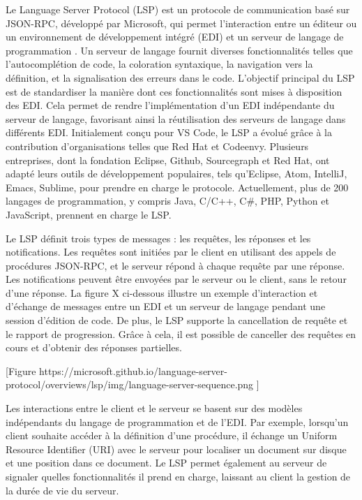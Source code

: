 Le Language Server Protocol (LSP) est un protocole de communication basé sur JSON-RPC, développé par Microsoft, qui permet l'interaction entre un éditeur ou un environnement de développement intégré (EDI) et un serveur de langage de programmation \cite{Keidel2016}. Un serveur de langage fournit diverses fonctionnalités telles que l'autocomplétion de code, la coloration syntaxique, la navigation vers la définition, et la signalisation des erreurs dans le code. L'objectif principal du LSP est de standardiser la manière dont ces fonctionnalités sont mises à disposition des EDI. Cela permet de rendre l'implémentation d'un EDI indépendante du serveur de langage, favorisant ainsi la réutilisation des serveurs de langage dans différents EDI. Initialement conçu pour VS Code, le LSP a évolué grâce à la contribution d'organisations telles que Red Hat et Codeenvy. Plusieurs entreprises, dont la fondation Eclipse, Github, Sourcegraph et Red Hat, ont adapté leurs outils de développement populaires, tels qu'Eclipse, Atom, IntelliJ, Emacs, Sublime, pour prendre en charge le protocole. Actuellement, plus de 200 langages de programmation, y compris Java, C/C++, C\#, PHP, Python et JavaScript, prennent en charge le LSP.

Le LSP définit trois types de messages : les requêtes, les réponses et les notifications. Les requêtes sont initiées par le client en utilisant des appels de procédures JSON-RPC, et le serveur répond à chaque requête par une réponse. Les notifications peuvent être envoyées par le serveur ou le client, sans le retour d'une réponse. La figure X ci-dessous illustre un exemple d'interaction et d'échange de messages entre un EDI et un serveur de langage pendant une session d'édition de code. De plus, le LSP supporte la cancellation de requête et le rapport de progression. Grâce à cela, il est possible de canceller des requêtes en cours et d'obtenir des réponses partielles.

    [Figure https://microsoft.github.io/language-server-protocol/overviews/lsp/img/language-server-sequence.png ]

Les interactions entre le client et le serveur se basent sur des modèles indépendants du langage de programmation et de l'EDI. Par exemple, lorsqu'un client souhaite accéder à la définition d'une procédure, il échange un Uniform Resource Identifier (URI) avec le serveur pour localiser un document sur disque et une position dans ce document. Le LSP permet également au serveur de signaler quelles fonctionnalités il prend en charge, laissant au client la gestion de la durée de vie du serveur.


